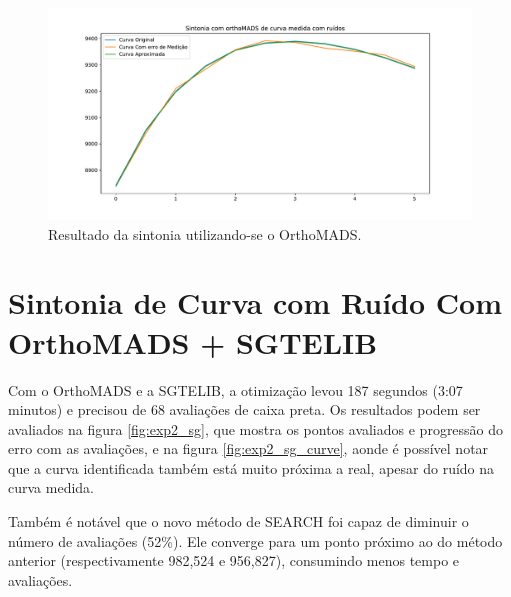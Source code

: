 \begin{figure}
\centering
  \includegraphics[width=1\linewidth]{figs/curva_om.pdf}
  \caption{Resultado da sintonia utilizando-se o OrthoMADS.}
  \label{fig:exp2_om_curve}
\end{figure}




\section{Sintonia de Curva com Ruído Com OrthoMADS + SGTELIB}

Com o OrthoMADS e a SGTELIB, a otimização levou 187 segundos (3:07 minutos) e precisou de 68 avaliações de caixa preta. Os resultados podem ser avaliados na figura \ref{fig:exp2_sg}, que mostra os pontos avaliados e progressão do erro com as avaliações, e na figura \ref{fig:exp2_sg_curve}, aonde é possível notar que a curva identificada também está muito próxima a real, apesar do ruído na curva medida. 
%

Também é notável que o novo método de SEARCH foi capaz de diminuir o número de avaliações (52\%).
%
Ele converge para um ponto próximo ao do método anterior (respectivamente 982,524 e 956,827), consumindo menos tempo e avaliações.



